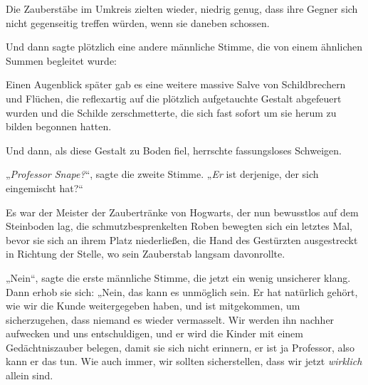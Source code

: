 Die Zauberstäbe im Umkreis zielten wieder, niedrig genug, dass ihre Gegner sich nicht gegenseitig treffen würden, wenn sie daneben schossen.

Und dann sagte plötzlich eine andere männliche Stimme, die von einem ähnlichen Summen begleitet wurde: 

Einen Augenblick später gab es eine weitere massive Salve von Schildbrechern und Flüchen, die reflexartig auf die plötzlich aufgetauchte Gestalt abgefeuert wurden und die Schilde zerschmetterte, die sich fast sofort um sie herum zu bilden begonnen hatten.

Und dann, als diese Gestalt zu Boden fiel, herrschte fassungsloses Schweigen.

„\emph{Professor Snape?}“, sagte die zweite Stimme. „\emph{Er} ist derjenige, der sich eingemischt hat?“

Es war der Meister der Zaubertränke von Hogwarts, der nun bewusstlos auf dem Steinboden lag, die schmutzbesprenkelten Roben bewegten sich ein letztes Mal, bevor sie sich an ihrem Platz niederließen, die Hand des Gestürzten ausgestreckt in Richtung der Stelle, wo sein Zauberstab langsam davonrollte.

„Nein“, sagte die erste männliche Stimme, die jetzt ein wenig unsicherer klang. Dann erhob sie sich: „Nein, das kann es unmöglich sein. Er hat natürlich gehört, wie wir die Kunde weitergegeben haben, und ist mitgekommen, um sicherzugehen, dass niemand es wieder vermasselt. Wir werden ihn nachher aufwecken und uns entschuldigen, und er wird die Kinder mit einem Gedächtniszauber belegen, damit sie sich nicht erinnern, er ist ja Professor, also kann er das tun. Wie auch immer, wir sollten sicherstellen, dass wir jetzt \emph{wirklich} allein sind. 

